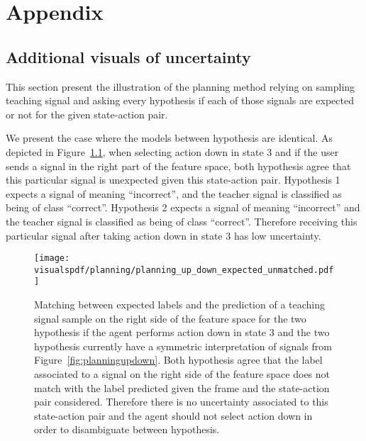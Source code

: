 

\chapter{Appendix}
\label{appendix}

\section{Additional visuals of uncertainty}
\label{appendix:uncertaintymeaning}

This section present the illustration of the planning method relying on sampling teaching signal and  asking every hypothesis if each of those signals are expected or not for the given state-action pair. 

We present the case where the models between hypothesis are identical. As depicted in Figure~\ref{fig:uncertaintymeaningupdownexpectedright}, when selecting action down in state 3 and if the user sends a signal in the right part of the feature space, both hypothesis agree that this particular signal is unexpected given this state-action pair. Hypothesis 1 expects a signal of meaning ``incorrect'', and the teacher signal is classified as being of class ``correct''. Hypothesis 2 expects a signal of meaning ``incorrect'' and the teacher signal is classified as being of class ``correct''. Therefore receiving this particular signal after taking action down in state 3 has low uncertainty.

\begin{figure}[!ht]
  \centering
  \texttt{[image: \\visualspdf/planning/planning\_up\_down\_expected\_unmatched.pdf]}
  \caption{Matching between expected labels and the prediction of a teaching signal sample on the right side of the feature space for the two hypothesis if the agent performs action down in state 3 and the two hypothesis currently have a symmetric interpretation of signals from Figure~\ref{fig:planningupdown}. Both hypothesis agree that the label associated to a signal on the right side of the feature space does not match with the label predicted given the frame and the state-action pair considered. Therefore there is no uncertainty associated to this state-action pair and the agent should not select action down in order to disambiguate between hypothesis.}
  \label{fig:uncertaintymeaningupdownexpectedright}
\end{figure}


